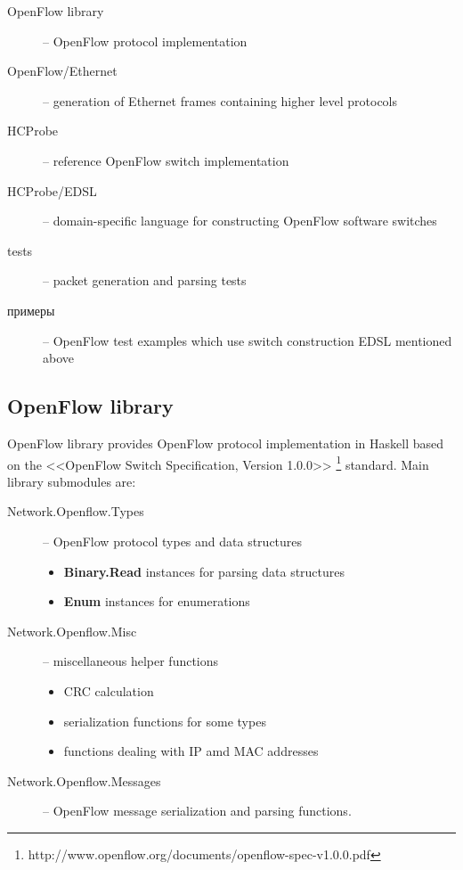 \documentclass[9pt,a4paper]{article}
\begin{document}
\begin{description}
    \item[OpenFlow library] -- OpenFlow protocol implementation
    \item[OpenFlow/Ethernet] -- generation of Ethernet frames
      containing higher level protocols
    \item[HCProbe] -- reference OpenFlow switch implementation
    \item[HCProbe/EDSL] -- domain-specific language for constructing
      OpenFlow software switches
    \item[tests] -- packet generation and parsing tests
    \item[примеры] -- OpenFlow test examples which use switch
      construction EDSL mentioned above
\end{description}


\subsection{OpenFlow library}

OpenFlow library provides OpenFlow protocol implementation in Haskell
based on the <<OpenFlow Switch Specification, Version 1.0.0>>
\footnote{http://www.openflow.org/documents/openflow-spec-v1.0.0.pdf} standard.
Main library submodules are:

\begin{description}
    \item[Network.Openflow.Types] -- OpenFlow protocol types and data
      structures
        \begin{itemize}
            \item \textbf{Binary.Read} instances for parsing data
              structures
            \item \textbf{Enum} instances for enumerations
        \end{itemize}
    \item[Network.Openflow.Misc] -- miscellaneous helper functions
        \begin{itemize}
            \item CRC calculation
            \item serialization functions for some types
            \item functions dealing with IP amd MAC addresses
        \end{itemize}
    \item[Network.Openflow.Messages] -- OpenFlow message
      serialization and parsing functions.
\end{description}
\end{document}
